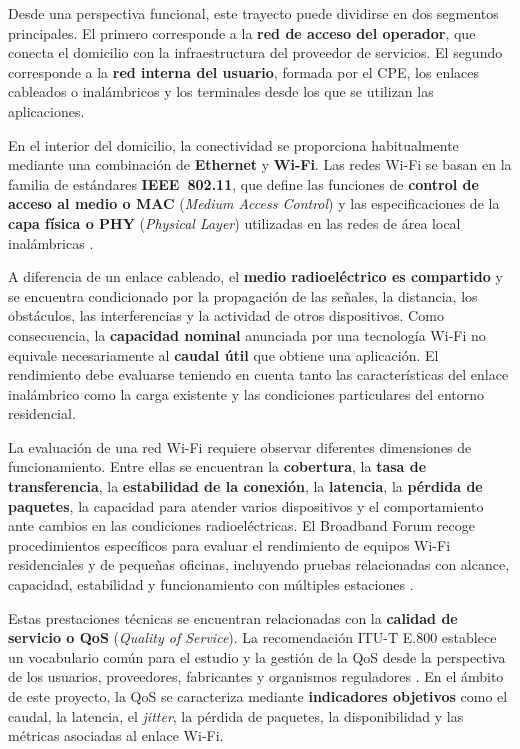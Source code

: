 Desde una perspectiva funcional, este trayecto puede dividirse en dos
segmentos principales. El primero corresponde a la
\textbf{red de acceso del operador}, que conecta el domicilio con la
infraestructura del proveedor de servicios. El segundo corresponde a la
\textbf{red interna del usuario}, formada por el CPE, los enlaces
cableados o inalámbricos y los terminales desde los que se utilizan las
aplicaciones.

En el interior del domicilio, la conectividad se proporciona
habitualmente mediante una combinación de \textbf{Ethernet} y
\textbf{Wi-Fi}. Las redes Wi-Fi se basan en la familia de estándares
\textbf{IEEE~802.11}, que define las funciones de
\textbf{control de acceso al medio o MAC}
(\textit{Medium Access Control}) y las especificaciones de la
\textbf{capa física o PHY}
(\textit{Physical Layer}) utilizadas en las redes de área local
inalámbricas \cite{ieee_80211_2024}.

A diferencia de un enlace cableado, el
\textbf{medio radioeléctrico es compartido} y se encuentra condicionado
por la propagación de las señales, la distancia, los obstáculos, las
interferencias y la actividad de otros dispositivos. Como consecuencia,
la \textbf{capacidad nominal} anunciada por una tecnología Wi-Fi no
equivale necesariamente al \textbf{caudal útil} que obtiene una
aplicación. El rendimiento debe evaluarse teniendo en cuenta tanto las
características del enlace inalámbrico como la carga existente y las
condiciones particulares del entorno residencial.

La evaluación de una red Wi-Fi requiere observar diferentes dimensiones
de funcionamiento. Entre ellas se encuentran la \textbf{cobertura}, la
\textbf{tasa de transferencia}, la \textbf{estabilidad de la conexión},
la \textbf{latencia}, la \textbf{pérdida de paquetes}, la capacidad para
atender varios dispositivos y el comportamiento ante cambios en las
condiciones radioeléctricas. El Broadband Forum recoge procedimientos
específicos para evaluar el rendimiento de equipos Wi-Fi residenciales y
de pequeñas oficinas, incluyendo pruebas relacionadas con alcance,
capacidad, estabilidad y funcionamiento con múltiples estaciones
\cite{bbf_tr398_i3c1}.

Estas prestaciones técnicas se encuentran relacionadas con la
\textbf{calidad de servicio o QoS}
(\textit{Quality of Service}). La recomendación ITU-T E.800 establece un
vocabulario común para el estudio y la gestión de la QoS desde la
perspectiva de los usuarios, proveedores, fabricantes y organismos
reguladores \cite{itu_e800}. En el ámbito de este proyecto, la QoS se
caracteriza mediante \textbf{indicadores objetivos} como el caudal, la
latencia, el \textit{jitter}, la pérdida de paquetes, la disponibilidad
y las métricas asociadas al enlace Wi-Fi.

